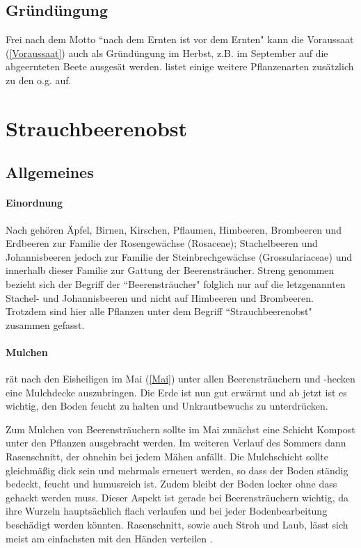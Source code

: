 \subsection{Gründüngung}
\label{Gründüngung}

Frei nach dem Motto ``nach dem Ernten ist vor dem Ernten" kann die Voraussaat (\ref{Voraussaat}) auch als Gründüngung im Herbst, z.B. im September auf die abgeernteten Beete ausgesät werden.
\citet[S.~114]{Heberer2018} listet einige weitere Pflanzenarten zusätzlich zu den o.g. auf.

\pagebreak

\section{Strauchbeerenobst}
\label{Strauchbeerenobst}

\subsection{Allgemeines}
\label{Strauchbeerenobst_allgemein}

\paragraph{Einordnung} 

Nach \citet[S.~168]{Seymour1978} gehören Äpfel, Birnen, Kirschen, Pflaumen, Himbeeren, Brombeeren und Erdbeeren zur Familie der Rosengewächse (Rosaceae);
Stachelbeeren und Johannisbeeren jedoch zur Familie der Steinbrechgewächse (Grossulariaceae) und innerhalb dieser Familie zur Gattung der Beerensträucher.
Streng genommen bezieht sich der Begriff der ``Beerensträucher" folglich nur auf die letzgenannten Stachel- und Johannisbeeren und nicht auf Himbeeren und Brombeeren.
Trotzdem sind hier alle Pflanzen unter dem Begriff ``Strauchbeerenobst" zusammen gefasst.

\paragraph{Mulchen}

\citet[S.~44]{Heberer2018} rät nach den Eisheiligen im \textrightarrow Mai (\ref{Mai}) unter allen Beerensträuchern und -hecken eine Mulchdecke auszubringen.
Die Erde ist nun gut erwärmt und ab jetzt ist es wichtig, den Boden feucht zu halten und Unkrautbewuchs zu unterdrücken.

Zum Mulchen von Beerensträuchern sollte im Mai zunächst eine Schicht Kompost unter den Pflanzen ausgebracht werden.
Im weiteren Verlauf des Sommers dann Rasenschnitt, der ohnehin bei jedem Mähen anfällt.
Die Mulchschicht sollte gleichmäßig dick sein und mehrmals erneuert werden, so dass der Boden ständig bedeckt, feucht und humusreich ist.
Zudem bleibt der Boden locker ohne dass gehackt werden muss.
Dieser Aspekt ist gerade bei Beerensträuchern wichtig, da ihre Wurzeln hauptsächlich flach verlaufen und bei jeder Bodenbearbeitung beschädigt werden könnten.
Rasenschnitt, sowie auch Stroh und Laub, lässt sich meist am einfachsten mit den Händen verteilen \citep[S.~45]{Heberer2018}.

